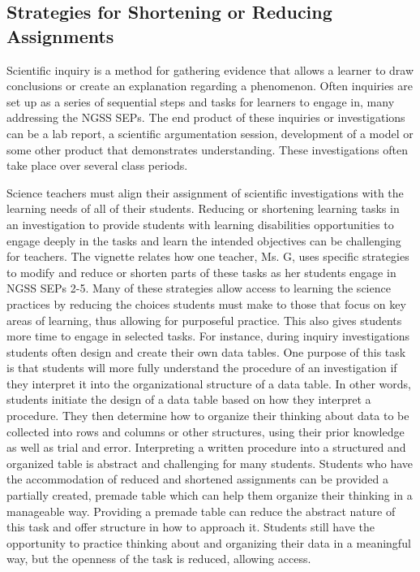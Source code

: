 \documentclass[11pt]{sig-alternate}
\begin{document}
\begin{large}
\section*{Strategies for Shortening or Reducing Assignments}
Scientific inquiry is a method for gathering evidence that allows a learner to draw conclusions or create an explanation regarding a phenomenon. Often inquiries are set up as a series of sequential steps and tasks for learners to engage in, many addressing the NGSS SEPs. The end product of these inquiries or investigations can be a lab report, a scientific argumentation session, development of a model or some other product that demonstrates understanding. These investigations often take place over several class periods.

Science teachers must align their assignment of scientific investigations with the learning needs of all of their students. Reducing or shortening learning tasks in an investigation to provide students with learning disabilities opportunities to engage deeply in the tasks and learn the intended objectives can be challenging for teachers. The vignette relates how one teacher, Ms. G, uses specific strategies to modify and reduce or shorten parts of these tasks as her students engage in NGSS SEPs 2-5. Many of these strategies allow access to learning the science practices by reducing the choices students must make to those that focus on key areas of learning, thus allowing for purposeful practice. This also gives students more time to engage in selected tasks. For instance, during inquiry investigations students often design and create their own data tables. One purpose of this task is that students will more fully understand the procedure of an investigation if they interpret it into the organizational structure of a data table. In other words, students initiate the design of a data table based on how they interpret a procedure. They then determine how to organize their thinking about data to be collected into rows and columns or other structures, using their prior knowledge as well as trial and error. Interpreting a written procedure into a structured and organized table is abstract and challenging for many students. Students who have the accommodation of reduced and shortened assignments can be provided a partially created, premade table which can help them organize their thinking in a manageable way. Providing a premade table can reduce the abstract nature of this task and offer structure in how to approach it. Students still have the opportunity to practice thinking about and organizing their data in a meaningful way, but the openness of the task is reduced, allowing access.


\end{large}
\end{document}
